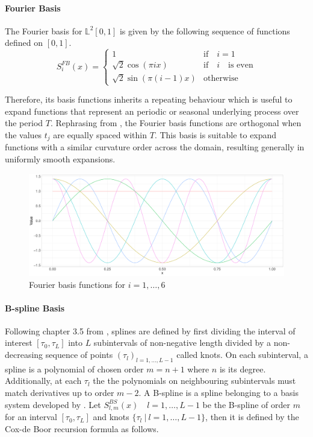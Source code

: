 \documentclass[11pt,twoside,a4paper]{article}
\begin{document}
	
	\paragraph{Fourier Basis}
	The Fourier basis for $\mathbb{L}^2[0,1]$ is given by the following sequence of functions defined on $[0,1]$.
	\begin{equation}
		S_{i}^{FB}(x) = 
		\begin{cases}
			1 & \text{if} \quad i = 1\\
			\sqrt{2} \cos(\pi i x) & \text{if} \quad i \quad \text{is even} \\
			\sqrt{2} \sin(\pi (i-1)x) & \text{otherwise}
		\end{cases}
	\end{equation}
	
	Therefore, its basis functions inherits a repeating behaviour which is useful to expand functions that represent an periodic or seasonal underlying process over the period $T$. Rephrasing from \cite{ramsay_functional_2005}, the Fourier basis functions are orthogonal when the values $t_j$ are equally spaced within $T$. This basis is suitable to expand functions with a similar curvature order across the domain, resulting generally in uniformly smooth expansions.  
	\begin{figure}[H]\label{fourier_basis}
	\includegraphics[width = \textwidth]{../Graphics/Fourier_Basis.pdf}
	\caption{Fourier basis functions for $i = 1,\dots,6$}
	\end{figure}

	\paragraph{B-spline Basis} Following chapter 3.5 from \cite{ramsay_functional_2005}, splines are defined by first dividing the interval of interest $[\tau_0, \tau_L]$ into $L$ subintervals of non-negative length divided by a non-decreasing sequence of points $(\tau_l)_{l = 1,\dots, L-1}$ called knots. On each subinterval, a spline is a polynomial of chosen order $m = n+1$ where $n$ is its degree. Additionally, at each $\tau_l$ the the polynomials on neighbouring subintervals must match derivatives up to order $m-2$.
	A B-spline is a spline belonging to a basis system developed by \cite{de_boor_practical_1978}. Let $S_{l,m}^{BS}(x) \quad l = 1,\dots,L-1$ be the B-spline of order $m$ for an interval $[\tau_0, \tau_L]$ and knots $\{\tau_l \: \vert \: l = 1,\dots, L-1\}$, then it is defined by the Cox-de Boor recursion formula as follows. 
\end{document}
